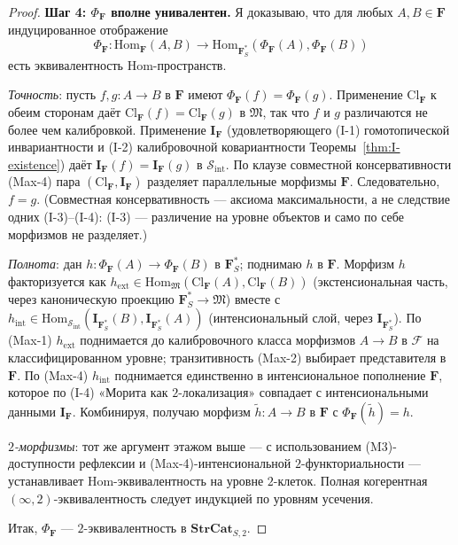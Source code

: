 \documentclass[11pt]{article}
\theoremstyle{plain}
\theoremstyle{definition}
\newcommand{\cS}{\mathcal{S}}
\newcommand{\cF}{\mathcal{F}}
\newcommand{\fM}{\mathfrak{M}}
\newcommand{\Sint}{\cS_{\mathrm{int}}}
\newcommand{\Hom}{\mathrm{Hom}}
\newcommand{\Cl}{\mathrm{Cl}}
\newcommand{\II}{\mathbf{I}}
\begin{document}
\begin{proof}
\textbf{Шаг 4: $\Phi_\mathbf{F}$ вполне унивалентен.} Я доказываю, что для любых $A, B \in \mathbf{F}$ индуцированное отображение
\[ \Phi_\mathbf{F} : \Hom_\mathbf{F}(A, B) \longrightarrow \Hom_{\mathbf{F}_S^*}(\Phi_\mathbf{F}(A), \Phi_\mathbf{F}(B)) \]
есть эквивалентность Hom-пространств.

\emph{Точность}: пусть $f, g : A \to B$ в $\mathbf{F}$ имеют $\Phi_\mathbf{F}(f) = \Phi_\mathbf{F}(g)$. Применение $\Cl_\mathbf{F}$ к обеим сторонам даёт $\Cl_\mathbf{F}(f) = \Cl_\mathbf{F}(g)$ в $\fM$, так что $f$ и $g$ различаются не более чем калибровкой. Применение $\II_\mathbf{F}$ (удовлетворяющего (I-1) гомотопической инвариантности и (I-2) калибровочной ковариантности Теоремы~\ref{thm:I-existence}) даёт $\II_\mathbf{F}(f) = \II_\mathbf{F}(g)$ в $\Sint$. По клаузе совместной консервативности (Max-4) пара $(\Cl_\mathbf{F}, \II_\mathbf{F})$ разделяет параллельные морфизмы $\mathbf{F}$. Следовательно, $f = g$. (Совместная консервативность — аксиома максимальности, а не следствие одних (I-3)--(I-4): (I-3) — различение на уровне объектов и само по себе морфизмов не разделяет.)

\emph{Полнота}: дан $h : \Phi_\mathbf{F}(A) \to \Phi_\mathbf{F}(B)$ в $\mathbf{F}_S^*$; поднимаю $h$ в $\mathbf{F}$. Морфизм $h$ факторизуется как $h_{\mathrm{ext}} \in \Hom_\fM(\Cl_\mathbf{F}(A), \Cl_\mathbf{F}(B))$ (экстенсиональная часть, через каноническую проекцию $\mathbf{F}_S^* \to \fM$) вместе с $h_{\mathrm{int}} \in \Hom_{\Sint}(\II_{\mathbf{F}_S^*}(B), \II_{\mathbf{F}_S^*}(A))$ (интенсиональный слой, через $\II_{\mathbf{F}_S^*}$). По (Max-1) $h_{\mathrm{ext}}$ поднимается до калибровочного класса морфизмов $A \to B$ в $\cF$ на классифицированном уровне; транзитивность (Max-2) выбирает представителя в $\mathbf{F}$. По (Max-4) $h_{\mathrm{int}}$ поднимается единственно в интенсиональное пополнение $\mathbf{F}$, которое по (I-4) «Морита как $2$-локализация» совпадает с интенсиональными данными $\II_\mathbf{F}$. Комбинируя, получаю морфизм $\tilde h : A \to B$ в $\mathbf{F}$ с $\Phi_\mathbf{F}(\tilde h) = h$.

\emph{$2$-морфизмы}: тот же аргумент этажом выше --- с использованием (M3)-доступности рефлексии и (Max-4)-интенсиональной $2$-функториальности --- устанавливает Hom-эквивалентность на уровне $2$-клеток. Полная когерентная $(\infty, 2)$-эквивалентность следует индукцией по уровням усечения.

Итак, $\Phi_\mathbf{F}$ — $2$-эквивалентность в $\mathbf{StrCat}_{S, 2}$.


\end{proof}
\end{document}
